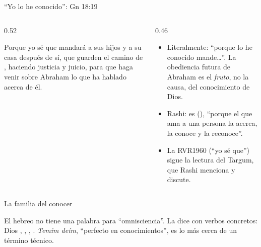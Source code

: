 \begin{frame}{``Yo lo he conocido'': Gn 18:19}
\begin{columns}[t,onlytextwidth]
\begin{column}{0.52\textwidth}
\begin{cita}Porque yo sé que mandará a sus hijos y a su casa después de sí, que guarden el camino de \SENOR{}, haciendo justicia y juicio, para que haga venir \SENOR{} sobre Abraham lo que ha hablado acerca de él.\end{cita}
\begin{center}\end{center}
\end{column}
\begin{column}{0.46\textwidth}\small
\begin{itemize}
\item Literalmente: ``porque lo he conocido  mande\ldots''. La obediencia futura de Abraham es el \emph{fruto}, no la causa, del conocimiento de Dios.
\item Rashi: es  (), ``porque el que ama a una persona la acerca, la conoce y la reconoce''.
\item La RVR1960 (``yo sé que'') sigue la lectura del Targum, que Rashi menciona y discute.
\end{itemize}
\end{column}
\end{columns}
\end{frame}

\begin{frame}{La familia del conocer}
\centering
{}\par\medskip
\small\RaggedRight El hebreo no tiene una palabra para ``omnisciencia''. La dice con verbos concretos: Dios , , , . \emph{Temim deím}, ``perfecto en conocimientos'', es lo más cerca de un término técnico.
\end{frame}

